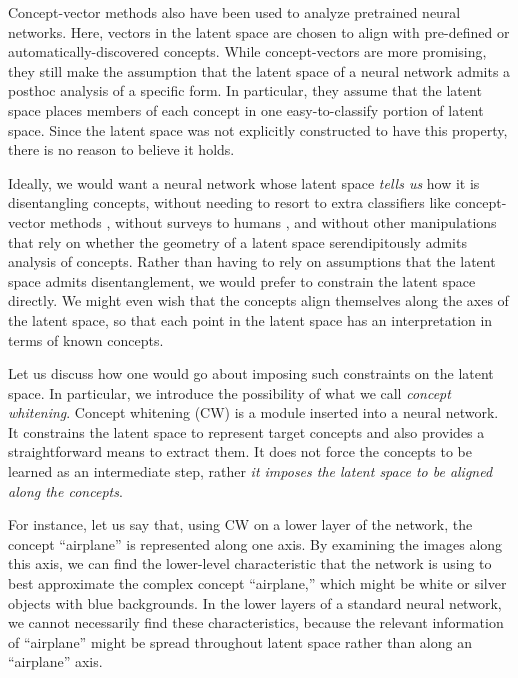 \documentclass{article}
\begin{document}
Concept-vector methods also \cite{kim2018interpretability,zhou2018interpretable,ghorbani2019towards} have been used to analyze pretrained neural networks. Here, vectors in the latent space are chosen to align with pre-defined or automatically-discovered concepts. While concept-vectors are more promising, they still make the assumption that the latent space of a neural network admits a posthoc analysis of a specific form. In particular, they assume that the latent space places members of each concept in one easy-to-classify portion of latent space. Since the latent space was not explicitly constructed to have this property, there is no reason to believe it holds.


Ideally, we would want a neural network whose latent space \textit{tells us} how it is disentangling concepts, without needing to resort to extra classifiers like concept-vector methods \cite{kim2018interpretability,ghorbani2019towards}, without surveys to humans \cite{zhou2014object}, and without other manipulations that rely on whether the geometry of a latent space serendipitously admits analysis of concepts. Rather than having to rely on assumptions that the latent space admits disentanglement, we would prefer to constrain the latent space directly. We might even wish that the concepts align themselves along the axes of the latent space, so that each point in the latent space has an interpretation in terms of known concepts.


Let us discuss how one would go about imposing such constraints on the latent space. In particular, we introduce the possibility of what we call \textit{concept whitening}. Concept whitening (CW) is a module inserted into a neural network. It constrains the latent space to represent target concepts and also provides a straightforward means to extract them. It does not force the concepts to be learned as an intermediate step, rather \textit{it imposes the latent space to be aligned along the concepts}. 

For instance, let us say that, using CW on a lower layer of the network, the concept ``airplane'' is represented along one axis. By examining the images along this axis, we can find the lower-level characteristic that the network is using to best approximate the complex concept ``airplane,'' which might be white or silver objects with blue backgrounds. In the lower layers of a standard neural network, we cannot necessarily find these characteristics, because the relevant information of ``airplane'' might be spread throughout latent space rather than along an ``airplane'' axis.
\end{document}
